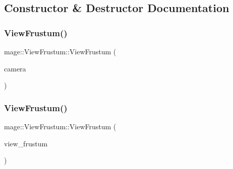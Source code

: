 \subsection{Constructor \& Destructor Documentation}
\hypertarget{classmage_1_1_view_frustum_ad1fd4a59f6cd0fd38289e66d4c6b5d51}{}\label{classmage_1_1_view_frustum_ad1fd4a59f6cd0fd38289e66d4c6b5d51} 
\subsubsection{\texorpdfstring{View\+Frustum()}{ViewFrustum()}\hspace{0.1cm}{\footnotesize\ttfamily [1/3]}}
{\footnotesize\ttfamily mage\+::\+View\+Frustum\+::\+View\+Frustum (\begin{DoxyParamCaption}\item[{const \hyperlink{classmage_1_1_camera}{Camera} \&}]{camera }\end{DoxyParamCaption})\hspace{0.3cm}{\ttfamily [explicit]}}

\hypertarget{classmage_1_1_view_frustum_abbd4ec6c2766d3f630bce16cefa8bc4d}{}\label{classmage_1_1_view_frustum_abbd4ec6c2766d3f630bce16cefa8bc4d} 
\subsubsection{\texorpdfstring{View\+Frustum()}{ViewFrustum()}\hspace{0.1cm}{\footnotesize\ttfamily [2/3]}}
{\footnotesize\ttfamily mage\+::\+View\+Frustum\+::\+View\+Frustum (\begin{DoxyParamCaption}\item[{const \hyperlink{classmage_1_1_view_frustum}{View\+Frustum} \&}]{view\+\_\+frustum }\end{DoxyParamCaption})\hspace{0.3cm}{\ttfamily [default]}}

\hypertarget{classmage_1_1_view_frustum_a3568cfa6a5d440455867eb11b88a5213}{}\label{classmage_1_1_view_frustum_a3568cfa6a5d440455867eb11b88a5213} 
